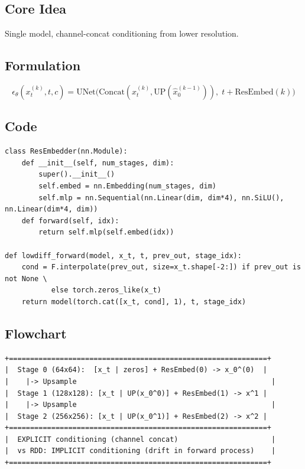 \documentclass[11pt, a4paper]{article}
\begin{document}
\subsection{Core Idea}
Single model, channel-concat conditioning from lower resolution.

\subsection{Formulation}

\begin{equation}
    \epsilon_\theta(x_t^{(k)}, t, c) = \mathrm{UNet}\bigl(\mathrm{Concat}(x_t^{(k)}, \mathrm{UP}(\hat{x}_0^{(k-1)})),\; t + \mathrm{ResEmbed}(k)\bigr)
\end{equation}

\subsection{Code}

\begin{lstlisting}[caption={LowDiff: ResEmbedder}]
class ResEmbedder(nn.Module):
    def __init__(self, num_stages, dim):
        super().__init__()
        self.embed = nn.Embedding(num_stages, dim)
        self.mlp = nn.Sequential(nn.Linear(dim, dim*4), nn.SiLU(), nn.Linear(dim*4, dim))
    def forward(self, idx):
        return self.mlp(self.embed(idx))

def lowdiff_forward(model, x_t, t, prev_out, stage_idx):
    cond = F.interpolate(prev_out, size=x_t.shape[-2:]) if prev_out is not None \
           else torch.zeros_like(x_t)
    return model(torch.cat([x_t, cond], 1), t, stage_idx)
\end{lstlisting}

\subsection{Flowchart}

\begin{lstlisting}[style=flowchart, caption={LowDiff Pipeline}]
+=============================================================+
|  Stage 0 (64x64):  [x_t | zeros] + ResEmbed(0) -> x_0^(0)  |
|    |-> Upsample                                              |
|  Stage 1 (128x128): [x_t | UP(x_0^0)] + ResEmbed(1) -> x^1 |
|    |-> Upsample                                              |
|  Stage 2 (256x256): [x_t | UP(x_0^1)] + ResEmbed(2) -> x^2 |
+=============================================================+
|  EXPLICIT conditioning (channel concat)                      |
|  vs RDD: IMPLICIT conditioning (drift in forward process)    |
+=============================================================+
\end{lstlisting}
\end{document}
